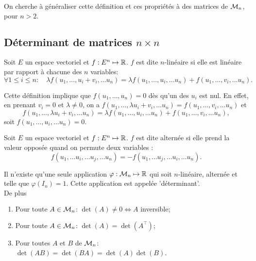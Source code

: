 \bigskip
On cherche à généraliser cette définition et ces propriétés à des matrices de $\mathcal{M}_n$, pour $n > 2$.

\subsection{Déterminant de matrices $n \times n$} 

\begin{definition} \label{def:applicationNLineaire}
  Soit $E$ un espace vectoriel et $f: E^n \mapsto \mathbb{R}$. $f$ est dite $n$-linéaire si elle est linéaire par rapport à chacune des $n$ variables:
  $$
  \forall 1 \leq i \leq n: \quad
  \lambda f(u_1, \dots, u_i + v_i, \dots u_n) 
  = \lambda f(u_1, \dots, u_i, \dots u_n) + f(u_1, \dots, v_i, \dots u_n).
  $$
\end{definition}

\remark
Cette définition implique que $f(u_1, \dots, u_n) = 0$ dès qu'un des $u_i$ est nul. En effet, en prenant $v_i = 0$ et $\lambda \neq 0$, on a $f(u_1, \dots, \lambda u_i + v_i, \dots u_n) = f(u_1, \dots, v_i, \dots u_n)$ et
$$
f(u_1, \dots, \lambda u_i + v_i, \dots u_n) 
= \lambda f(u_1, \dots, u_i, \dots u_n) + f(u_1, \dots, v_i, \dots u_n), 
$$
soit $f(u_1, \dots, u_i, \dots u_n) = 0$.

\begin{definition} \label{def:applicationAlternee}
  Soit $E$ un espace vectoriel et $f: E^n \mapsto \mathbb{R}$. $f$ est dite alternée si elle prend la valeur opposée quand on permute deux variables : 
  $$
  f(u_1, \dots u_i, \dots u_j, \dots u_n)
  =
  - f(u_1, \dots u_j, \dots u_i, \dots u_n).
  $$
\end{definition}

\begin{theorem} \label{thm:uniciteDeterminant}
  Il n'existe qu'une seule application $\varphi: \mathcal{M}_n \mapsto \mathbb{R}$ qui soit $n$-linéaire, alternée et telle que $\varphi(I_n) = 1$. Cette application est appelée 'déterminant'. \\
  De plus
  \begin{enumerate}[($a$)]
   \item Pour toute $A \in \mathcal{M}_n$: $\det(A) \neq 0 \Leftrightarrow A$ inversible;
   \item Pour toute $A \in \mathcal{M}_n$: $\det(A) = \det(A^\top)$;
   \item Pour toutes $A$ et $B$ de $\mathcal{M}_n$: $\det(A B) = \det(B A) = \det(A) \det(B)$.
  \end{enumerate}
\end{theorem}

